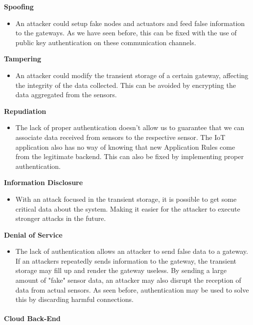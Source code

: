 \textbf{Spoofing}

\begin{itemize}
    \item An attacker could setup fake nodes and actuators and feed false information to the gateways. As we have seen before, this can be fixed with the use of public key authentication on these communication channels.
\end{itemize}

\textbf{Tampering}

\begin{itemize}
    \item An attacker could modify the transient storage of a certain gateway, affecting the integrity of the data collected. This can be avoided by encrypting the data aggregated from the sensors.
\end{itemize}

\textbf{Repudiation}
\begin{itemize}
    \item The lack of proper authentication doesn't allow us to guarantee that we can associate data received from sensors to the respective sensor. The IoT application also has no way of knowing that new Application Rules come from the legitimate backend. This can also be fixed by implementing proper authentication.
\end{itemize}

\textbf{Information Disclosure}

\begin{itemize}
    \item With an attack focused in the transient storage, it is possible to get some critical data about the system. Making it easier for the attacker to execute stronger attacks in the future.
\end{itemize}

\textbf{Denial of Service}

\begin{itemize}
    \item The lack of authentication allows an attacker to send false data to a gateway. If an attackers repeatedly sends information to the gateway, the transient storage may fill up and render the gateway useless. By sending a large amount of "fake" sensor data, an attacker may also disrupt the reception of data from actual sensors. As seen before, authentication may be used to solve this by discarding harmful connections.
\end{itemize}

\paragraph{Cloud Back-End}\mbox{}

